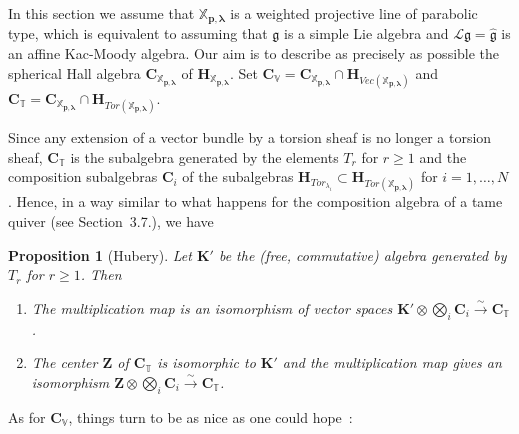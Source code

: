 \documentclass[a4paper,10pt]{amsart}
\def\H{\mathbf{H}}
\def\CC{\mathbf{C}}
\def\g{\mathfrak{g}}
\def\xpl{\mathbb{X}_{\mathbf{p},\boldsymbol{\lambda}}}
\newtheorem{prop}[theo]{Proposition}
\numberwithin{equation}{section}
\begin{document}
{\vspace{.15in}

In this section we assume that $\xpl$ is a weighted projective line of parabolic type, which is equivalent to assuming that $\g$ is a simple Lie algebra and $\mathcal{L}\g=\widehat{\g}$ is an affine Kac-Moody algebra. Our aim is to describe as precisely as possible the spherical Hall algebra $\mathbf{C}_{\xpl}$ of $\H_{\xpl}$. Set $\CC_{\mathbb{V}}=\CC_{\xpl} \cap \H_{Vec(\xpl)}$ and $\CC_{\mathbb{T}}=\CC_{\xpl} \cap \H_{Tor(\xpl)}$.

Since any extension of a vector bundle by a torsion sheaf is no longer a torsion sheaf, $\CC_{\mathbb{T}}$ is the subalgebra generated by the elements $T_r$ for $r \geq 1$ and the composition subalgebras $\CC_i$ of the subalgebras $\H_{Tor_{\lambda_i}} \subset \H_{Tor(\xpl)}$ for $i=1, \ldots, N$. Hence, in a way similar to what happens for the composition algebra of a tame quiver (see Section~3.7.), we have

\begin{prop}[Hubery]\label{P:Hubtor}
Let $\mathbf{K}'$ be the (free, commutative) algebra generated by $T_r$ for $r \geq 1$. Then
\begin{enumerate}
\item[i)] The multiplication map is an isomorphism of vector spaces $\mathbf{K}' \otimes \bigotimes_i \mathbf{C}_i \stackrel{\sim}{\to} \mathbf{C}_{\mathbb{T}}$.
\item[ii)] The center $\mathbf{Z}$ of $\mathbf{C}_{\mathbb{T}}$ is isomorphic to $\mathbf{K}'$ and the multiplication map gives an isomorphism $\mathbf{Z} \otimes \bigotimes_i \mathbf{C}_i \stackrel{\sim}{\to} \mathbf{C}_{\mathbb{T}}$.
\end{enumerate}
\end{prop}

\vspace{.15in}

As for $\CC_{\mathbb{V}}$, things turn to be as nice as one could hope~:

\vspace{.1in}

}
\end{document}
